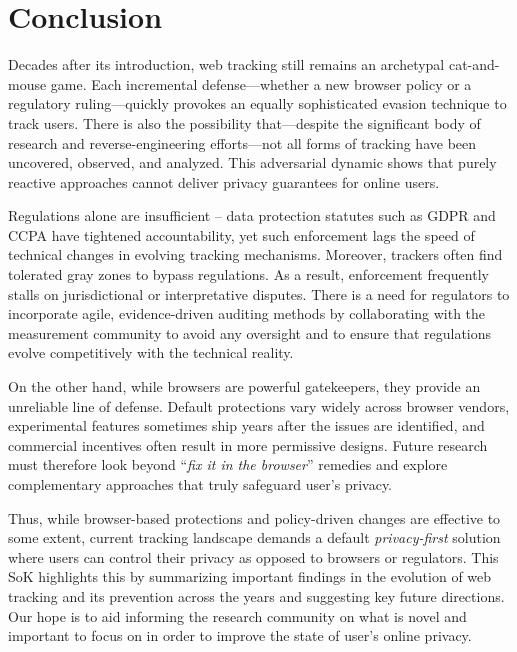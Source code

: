 \section{Conclusion}

Decades after its introduction, web tracking still remains an archetypal cat-and-mouse game.
%
Each incremental defense---whether a new browser policy or a regulatory ruling---quickly provokes an equally sophisticated evasion technique to track users.
%
There is also the possibility that---despite the significant body of research and reverse-engineering efforts---not all forms of tracking have been uncovered, observed, and analyzed.
%
This adversarial dynamic shows that purely reactive approaches cannot deliver privacy guarantees for online users.

Regulations alone are insufficient -- data protection statutes such as GDPR and CCPA have tightened accountability, yet such enforcement lags the speed of technical changes in evolving tracking mechanisms.
%
Moreover, trackers often find tolerated gray zones to bypass regulations.
%
As a result, enforcement frequently stalls on jurisdictional or interpretative disputes. 
%
There is a need for regulators to incorporate agile, evidence-driven auditing methods by collaborating with the measurement community to avoid any oversight and to ensure that regulations evolve competitively with the technical reality.

On the other hand, while browsers are powerful gatekeepers, they provide an unreliable line of defense.
%
Default protections vary widely across browser vendors, experimental features sometimes ship years after the issues are identified, and commercial incentives often result in more permissive designs. 
%
Future research must therefore look beyond ``\textit{fix it in the browser}'' remedies and explore complementary approaches that truly safeguard user's privacy.

Thus, while browser-based protections and policy-driven changes are effective to some extent, current tracking landscape demands a default \textit{privacy-first} solution where users can control their privacy as opposed to browsers or regulators.
%
This SoK highlights this by summarizing important findings in the evolution of web tracking and its prevention across the years and suggesting key future directions.
%
Our hope is to aid informing the research community on what is novel and important to focus on in order to improve the state of user's online privacy.
